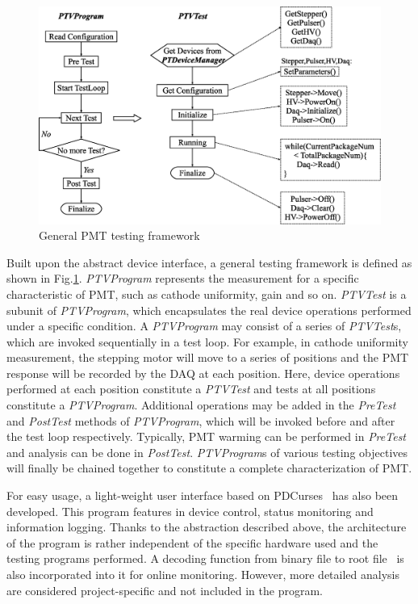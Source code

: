 \documentclass[review, times]{elsarticle}
\begin{document}
\begin{figure}
  \centering
 \includegraphics[width=125mm]{FIG6}
\caption{General PMT testing framework}
\label{fig:FIG6}
\end{figure}

Built upon the abstract device interface, a general testing framework is defined as shown in Fig.\ref{fig:FIG6}.
\textit{PTVProgram} represents the measurement for a specific characteristic of PMT, such as cathode uniformity, gain and so on.
\textit{PTVTest} is a subunit of \textit{PTVProgram}, which encapsulates the real device operations performed under a specific condition.
A \textit{PTVProgram} may consist of a series of \textit{PTVTest}s, which are invoked sequentially in a test loop.
For example, in cathode uniformity measurement, the stepping motor will move to a series of positions and the PMT response will be recorded by the DAQ at each position.
Here, device operations performed at each position constitute a \textit{PTVTest} and tests at all positions constitute a \textit{PTVProgram}.
Additional operations may be added in the \textit{PreTest} and \textit{PostTest} methods of \textit{PTVProgram}, which will be invoked before and after the test loop respectively.
Typically, PMT warming can be performed in \textit{PreTest} and analysis can be done in \textit{PostTest}.
\textit{PTVProgram}s of various testing objectives will finally be chained together to constitute a complete characterization of PMT.

For easy usage, a light-weight user interface based on PDCurses~\cite{pdcurses} has also been developed.
This program features in device control, status monitoring and information logging.
Thanks to the abstraction described above, the architecture of the program is rather independent of the specific hardware used and the testing programs performed.
A decoding function from binary file to root file~\cite{root} is also incorporated into it for online monitoring.
However, more detailed analysis are considered project-specific and not included in the program. 
\end{document}
